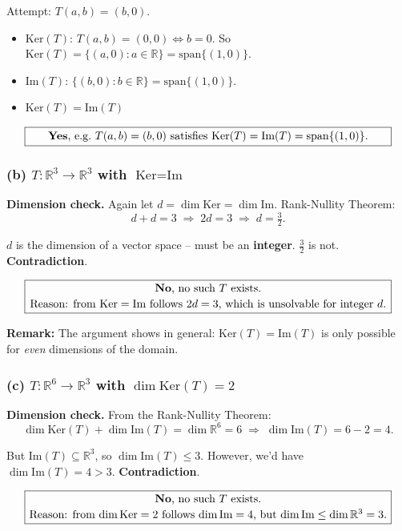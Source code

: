 \documentclass[a4paper,12pt]{article}
\begin{document}
Attempt: $T(a, b) = (b, 0)$.
\begin{itemize}[leftmargin=*, nosep]
    \item $\text{Ker}(T)$: $T(a, b) = (0, 0) \iff b = 0$. So $\text{Ker}(T) = \{(a, 0) : a \in \mathbb{R}\} = \text{span}\{(1, 0)\}$.
    \item $\text{Im}(T)$: $\{(b, 0) : b \in \mathbb{R}\} = \text{span}\{(1, 0)\}$.
    \item $\text{Ker}(T) = \text{Im}(T)$ \checkmark
\end{itemize}

\[
\fbox{\parbox{0.93\textwidth}{\centering
\textbf{Yes}, e.g.\ $T(a, b) = (b, 0)$ satisfies $\text{Ker}(T) = \text{Im}(T) = \text{span}\{(1, 0)\}$.
}}
\]

\subsubsection*{(b) $T \colon \mathbb{R}^3 \to \mathbb{R}^3$ with $\text{Ker} = \text{Im}$}

\textbf{Dimension check.} Again let $d = \dim \text{Ker} = \dim \text{Im}$. Rank-Nullity Theorem:
\[
d + d = 3 \;\Rightarrow\; 2d = 3 \;\Rightarrow\; d = \tfrac{3}{2}.
\]

$d$ is the dimension of a vector space -- must be an \textbf{integer}. $\tfrac{3}{2}$ is not. \textbf{Contradiction}.

\[
\fbox{\parbox{0.93\textwidth}{\centering
\textbf{No}, no such $T$ exists. \\[2pt]
Reason: from $\text{Ker} = \text{Im}$ follows $2d = 3$, which is unsolvable for integer $d$.
}}
\]

\textbf{Remark:} The argument shows in general: $\text{Ker}(T) = \text{Im}(T)$ is only possible for \emph{even} dimensions of the domain.

\subsubsection*{(c) $T \colon \mathbb{R}^6 \to \mathbb{R}^3$ with $\dim \text{Ker}(T) = 2$}

\textbf{Dimension check.} From the Rank-Nullity Theorem:
\[
\dim \text{Ker}(T) + \dim \text{Im}(T) = \dim \mathbb{R}^6 = 6 \;\Rightarrow\; \dim \text{Im}(T) = 6 - 2 = 4.
\]

But $\text{Im}(T) \subseteq \mathbb{R}^3$, so $\dim \text{Im}(T) \leq 3$. However, we'd have $\dim \text{Im}(T) = 4 > 3$. \textbf{Contradiction}.

\[
\fbox{\parbox{0.93\textwidth}{\centering
\textbf{No}, no such $T$ exists. \\[2pt]
Reason: from $\dim \text{Ker} = 2$ follows $\dim \text{Im} = 4$, but $\dim \text{Im} \leq \dim \mathbb{R}^3 = 3$.
}}
\]
\end{document}
